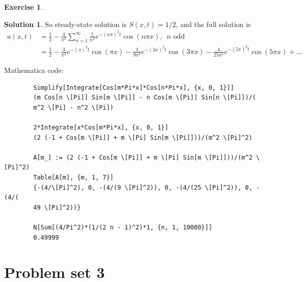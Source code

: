 \documentclass{book}
\theoremstyle{definition}
\newtheorem*{exer*}{Exercise}
\newtheorem*{sln*}{Solution}
\begin{document}
\begin{exer*}
\begin{sln*}
		So steady-state solution is $S(x,t) = 1/2$, and the full solution is
		\begin{align*}
		u(x,t) &= \frac{1}{2}-\frac{4}{\pi^2}\sum_{n=1}^\infty \frac{1}{n^2}e^{-(n\pi)^2 t}\cos(n\pi x),\,\,\, n \text{ odd}\\
		&= \frac{1}{2}-\frac{4}{\pi ^2}e^{-(\pi)^2 t}\cos(\pi x)    -\frac{4}{9 \pi ^2}e^{-(3\pi)^2 t}\cos(3\pi x)        -\frac{4}{25 \pi ^2}e^{-(5\pi)^2 t}\cos(5\pi x) + \dots
		\end{align*}
		
		\noindent Mathematica code:
		\begin{lstlisting}
		Simplify[Integrate[Cos[m*Pi*x]*Cos[n*Pi*x], {x, 0, 1}]]
		(m Cos[n \[Pi]] Sin[m \[Pi]] - n Cos[m \[Pi]] Sin[n \[Pi]])/(
		m^2 \[Pi] - n^2 \[Pi])
		
		2*Integrate[x*Cos[m*Pi*x], {x, 0, 1}]
		(2 (-1 + Cos[m \[Pi]] + m \[Pi] Sin[m \[Pi]]))/(m^2 \[Pi]^2)
		
		A[m_] := (2 (-1 + Cos[m \[Pi]] + m \[Pi] Sin[m \[Pi]]))/(m^2 \[Pi]^2)
		Table[A[m], {m, 1, 7}]
		{-(4/\[Pi]^2), 0, -(4/(9 \[Pi]^2)), 0, -(4/(25 \[Pi]^2)), 0, -(4/(
		49 \[Pi]^2))}
		
		N[Sum[(4/Pi^2)*(1/(2 n - 1)^2)*1, {n, 1, 10000}]]
		0.49999
		\end{lstlisting}
	\end{sln*}
\end{exer*}


\newpage
\section{Problem set 3} 
\end{document}
